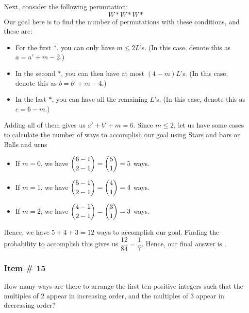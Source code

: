 \documentclass[11pt,paper=letter]{scrartcl}
\begin{document}
Next, consider the following permutation: $$W * W * W*$$ Our goal here is to find the number of permutations with these conditions, and these are:

\begin{itemize}
    \item For the first $*$, you can only have $m \leq 2 L$'s. (In this case, denote this as $a = a' + m - 2.$)
    \item In the second $*$, you can then have at most $(4 - m) L$'s. (In this case, denote this as $b = b' + m - 4.$)
    \item In the last $*$, you can have all the remaining $L$'s. (In this case, denote this as $c = 6 - m.$)
  
     \end{itemize}
     
   Adding all of them gives us $a' + b ' + m = 6$. Since $m \leq 2$, let us have some cases to calculate the number of ways to accomplish our goal using Stars and bars or Balls and urns
   
   \begin{itemize}
       \item If $m=0$, we have $\dbinom{6-1}{2-1} = \dbinom{5}{1} = 5$ ways.
       
       \item If $m=1$, we have $\dbinom{5-1}{2-1} = \dbinom{4}{1} = 4$ ways.
       
       \item If $m=2$, we have $\dbinom{4-1}{2-1} = \dbinom{3}{1} = 3$ ways.
   \end{itemize}
   
   Hence, we have $5+4+3 = 12$ ways to accomplish our goal. Finding the probability to accomplish this gives us $\dfrac{12}{84} = \dfrac{1}{7}$. Hence, our final answer is .


\subsubsection{Item \# 15}

\begin{probboxed}
How many ways are there to arrange the first ten positive integers such that the multiples of 2 appear in increasing order, and the multiples of 3 appear in decreasing order?

\end{probboxed}

\end{document}

